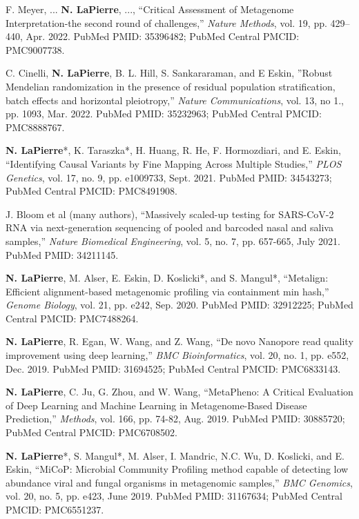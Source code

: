 \documentclass[margin, 10pt]{res} %
\begin{document}
\begin{resume}
F. Meyer, ... \textbf{N. LaPierre}, ..., ``Critical Assessment of Metagenome Interpretation-the second round of challenges,'' \emph{Nature Methods}, vol. 19, pp. 429–440, Apr. 2022.  PubMed PMID: 35396482; PubMed Central PMCID: PMC9007738.

C. Cinelli, \textbf{N. LaPierre}, B. L. Hill, S. Sankararaman, and E Eskin, ''Robust Mendelian randomization in the presence of residual population stratification, batch effects and horizontal pleiotropy,'' \emph{Nature Communications}, vol. 13, no 1., pp. 1093, Mar. 2022.  PubMed PMID: 35232963; PubMed Central PMCID: PMC8888767.

\textbf{N. LaPierre}*, K. Taraszka*, H. Huang, R. He, F. Hormozdiari, and E. Eskin, ``Identifying Causal Variants by Fine Mapping Across Multiple Studies,'' \emph{PLOS Genetics}, vol. 17, no. 9, pp. e1009733, Sept. 2021.  PubMed PMID: 34543273; PubMed Central PMCID: PMC8491908.

J. Bloom et al (many authors), ``Massively scaled-up testing for SARS-CoV-2 RNA via next-generation sequencing of pooled and barcoded nasal and saliva samples,'' \emph{Nature Biomedical Engineering}, vol. 5, no. 7, pp. 657-665, July 2021.  PubMed PMID: 34211145.

\textbf{N. LaPierre}, M. Alser, E. Eskin, D. Koslicki*, and S. Mangul*, ``Metalign: Efficient alignment-based metagenomic profiling via containment min hash,'' \emph{Genome Biology}, vol. 21, pp. e242, Sep. 2020. PubMed PMID: 32912225; PubMed Central PMCID: PMC7488264.


\textbf{N. LaPierre}, R. Egan, W. Wang, and Z. Wang, ``De novo Nanopore read quality improvement using deep learning,'' \emph{BMC Bioinformatics}, vol. 20, no. 1, pp. e552, Dec. 2019. PubMed PMID: 31694525; PubMed Central PMCID: PMC6833143.

\textbf{N. LaPierre}, C. Ju, G. Zhou, and W. Wang, ``MetaPheno: A Critical Evaluation of Deep Learning and Machine Learning in Metagenome-Based Disease Prediction,'' \emph{Methods}, vol. 166, pp. 74-82, Aug. 2019. PubMed PMID: 30885720; PubMed Central PMCID: PMC6708502.

\textbf{N. LaPierre}*, S. Mangul*, M. Alser, I. Mandric, N.C. Wu, D. Koslicki, and E. Eskin, ``MiCoP: Microbial Community Profiling method capable of detecting low abundance viral and fungal organisms in metagenomic samples,'' \emph{BMC Genomics}, vol. 20, no. 5, pp. e423, June 2019. PubMed PMID: 31167634; PubMed Central PMCID: PMC6551237.


\end{resume}
\end{document}
